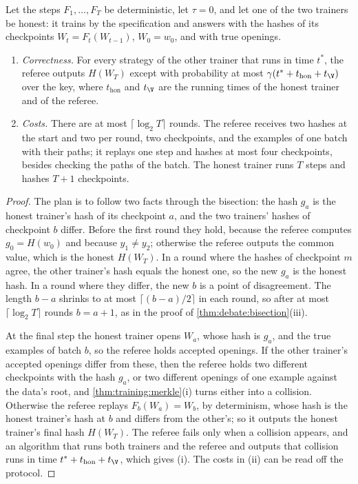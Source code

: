 \begin{refsection}
\begin{theorem}\label{thm:training:refereed}
Let the steps $F_1,\dots,F_T$ be deterministic, let $\tau=0$, and let one of the two trainers be honest: it trains by the specification and answers with the hashes of its checkpoints $W_t=F_t(W_{t-1})$, $W_0=w_0$, and with true openings.
\begin{enumerate}
\item \emph{Correctness.} For every strategy of the other trainer that runs in time $t^*$, the referee outputs $H(W_T)$ except with probability at most $\gamma(t^*+t_{\mathrm{hon}}+t_{\V})$ over the key, where $t_{\mathrm{hon}}$ and $t_{\V}$ are the running times of the honest trainer and of the referee.
\item \emph{Costs.} There are at most $\lceil\log_2T\rceil$ rounds. The referee receives two hashes at the start and two per round, two checkpoints, and the examples of one batch with their paths; it replays one step and hashes at most four checkpoints, besides checking the paths of the batch. The honest trainer runs $T$ steps and hashes $T+1$ checkpoints.
\end{enumerate}
\end{theorem}

\begin{proof}
The plan is to follow two facts through the bisection: the hash $g_a$ is the honest trainer's hash of its checkpoint $a$, and the two trainers' hashes of checkpoint $b$ differ. Before the first round they hold, because the referee computes $g_0=H(w_0)$ and because $y_1\ne y_2$; otherwise the referee outputs the common value, which is the honest $H(W_T)$. In a round where the hashes of checkpoint $m$ agree, the other trainer's hash equals the honest one, so the new $g_a$ is the honest hash. In a round where they differ, the new $b$ is a point of disagreement. The length $b-a$ shrinks to at most $\lceil(b-a)/2\rceil$ in each round, so after at most $\lceil\log_2T\rceil$ rounds $b=a+1$, as in the proof of \cref{thm:debate:bisection}(iii).

At the final step the honest trainer opens $W_a$, whose hash is $g_a$, and the true examples of batch $b$, so the referee holds accepted openings. If the other trainer's accepted openings differ from these, then the referee holds two different checkpoints with the hash $g_a$, or two different openings of one example against the data's root, and \cref{thm:training:merkle}(i) turns either into a collision. Otherwise the referee replays $F_b(W_a)=W_b$, by determinism, whose hash is the honest trainer's hash at $b$ and differs from the other's; so it outputs the honest trainer's final hash $H(W_T)$. The referee fails only when a collision appears, and an algorithm that runs both trainers and the referee and outputs that collision runs in time $t^*+t_{\mathrm{hon}}+t_{\V}$, which gives (i). The costs in (ii) can be read off the protocol.
\end{proof}


\end{refsection}
